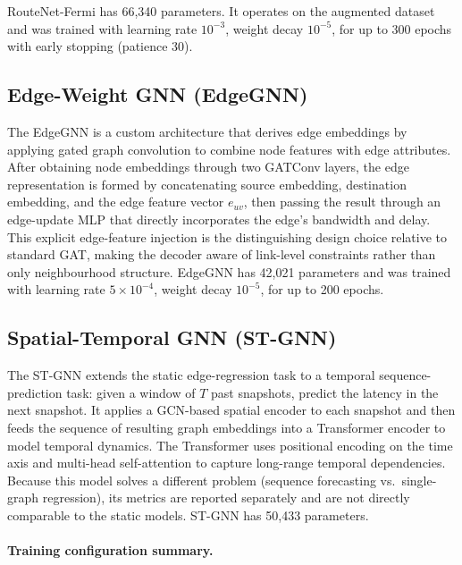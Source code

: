 \documentclass[12pt]{article}
\begin{document}
RouteNet-Fermi has 66,340 parameters. It operates on the augmented dataset and was trained with learning rate $10^{-3}$, weight decay $10^{-5}$, for up to 300 epochs with early stopping (patience 30).

\subsection{Edge-Weight GNN (EdgeGNN)}
The EdgeGNN is a custom architecture that derives edge embeddings by applying gated graph convolution to combine node features with edge attributes. After obtaining node embeddings through two GATConv layers, the edge representation is formed by concatenating source embedding, destination embedding, and the edge feature vector $e_{uv}$, then passing the result through an edge-update MLP that directly incorporates the edge's bandwidth and delay. This explicit edge-feature injection is the distinguishing design choice relative to standard GAT, making the decoder aware of link-level constraints rather than only neighbourhood structure. EdgeGNN has 42,021 parameters and was trained with learning rate $5 \times 10^{-4}$, weight decay $10^{-5}$, for up to 200 epochs.

\subsection{Spatial-Temporal GNN (ST-GNN)}
The ST-GNN extends the static edge-regression task to a temporal sequence-prediction task: given a window of $T$ past snapshots, predict the latency in the next snapshot. It applies a GCN-based spatial encoder to each snapshot and then feeds the sequence of resulting graph embeddings into a Transformer encoder \cite{transformerVaswani} to model temporal dynamics. The Transformer uses positional encoding on the time axis and multi-head self-attention to capture long-range temporal dependencies. Because this model solves a different problem (sequence forecasting vs.\ single-graph regression), its metrics are reported separately and are not directly comparable to the static models. ST-GNN has 50,433 parameters.

\paragraph{Training configuration summary.}
\end{document}
